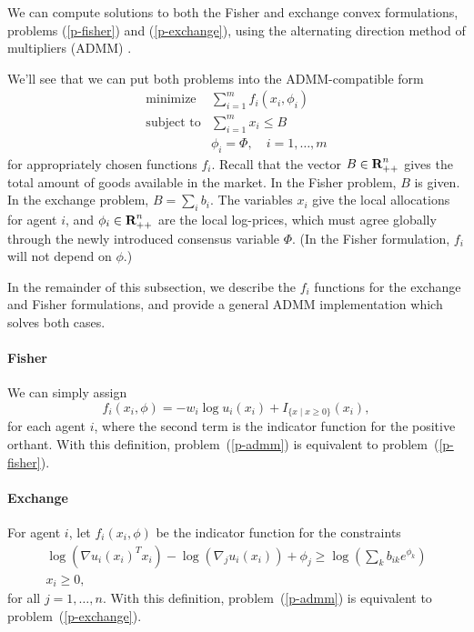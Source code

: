 \documentclass[12pt]{article}
\begin{document}
We can compute solutions to both the Fisher and
exchange convex formulations, problems (\ref{p-fisher}) and (\ref{p-exchange}),
using the alternating direction method of multipliers (ADMM)
\cite{boyd2011distributed, parikh2013proximal}.

We'll see that we can put both problems into the ADMM-compatible form
\begin{equation}
\label{p-admm}
\begin{array}{ll}
\mbox{minimize} & \sum_{i=1}^m f_i(x_i, \phi_i) \\
\mbox{subject to} & \sum_{i=1}^m x_i \leq B\\
& \phi_i = \Phi, \quad i=1,\ldots,m
\end{array}
\end{equation}
for appropriately chosen functions $f_i$. Recall that the vector $B \in
{\mbox{\bf R}}^n_{++}$ gives the total amount of goods available in the market. In the
Fisher problem, $B$ is given. In the exchange problem, $B = \sum_i b_i$. The
variables $x_i$ give the local allocations for agent $i$, and $\phi_i \in
{\mbox{\bf R}}^n_{++}$ are the local log-prices, which must agree globally through the
newly introduced consensus variable $\Phi$. (In the Fisher formulation, $f_i$
will not depend on $\phi$.)

In the remainder of this subsection, we describe the $f_i$ functions for the
exchange and Fisher formulations, and provide a general ADMM implementation
which solves both cases.

\paragraph{Fisher}
We can simply assign
\[
f_i(x_i, \phi) = -w_i \log u_i(x_i) + I_{\lbrace x \mid x \geq 0 \rbrace}(x_i),
\]
for each agent $i$,
where the second term is the indicator function for the positive orthant.
With this definition, problem~(\ref{p-admm}) is equivalent to
problem~(\ref{p-fisher}).

\paragraph{Exchange}

For agent $i$, let $f_i(x_i, \phi)$ be the indicator function for the
constraints
\[
\begin{array}{c}
\log(\nabla u_i(x_i)^T x_i) - \log(\nabla_j u_i(x_i)) + \phi_j \geq  \log\left(\sum_k b_{ik} e^{\phi_{k}}\right)\\
x_i \geq 0,
\end{array}
\]
for all $j=1,\ldots,n$.
With this definition, problem~(\ref{p-admm}) is equivalent to problem~(\ref{p-exchange}).
\end{document}
